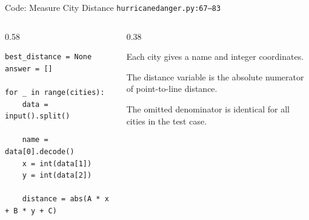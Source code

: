 \documentclass[aspectratio=169,11pt]{beamer}
\begin{document}
\begin{frame}[fragile]{Code: Measure City Distance}
\scriptsize
{} \texttt{hurricanedanger.py:67--83}

\vspace{0.08cm}
\begin{columns}[T,totalwidth=\textwidth]
\begin{column}{0.58\textwidth}
\begin{lstlisting}[style=cpcode]
best_distance = None
answer = []

for _ in range(cities):
    data = input().split()

    name = data[0].decode()
    x = int(data[1])
    y = int(data[2])

    distance = abs(A * x + B * y + C)
\end{lstlisting}
\end{column}
\begin{column}{0.38\textwidth}
\begin{tightitemize}
  \item Each city gives a name and integer coordinates.
  \item The distance variable is the absolute numerator of point-to-line distance.
  \item The omitted denominator is identical for all cities in the test case.
\end{tightitemize}
\end{column}
\end{columns}
\end{frame}
\end{document}

